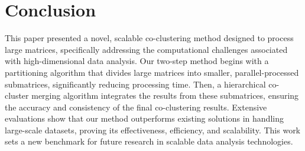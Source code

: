 \documentclass[journal]{IEEEtran}
\begin{document}
\section{Conclusion}
\label{sec:conclusion}
This paper presented a novel, scalable co-clustering method designed to process large matrices, specifically addressing the computational challenges associated with high-dimensional data analysis. Our two-step method begins with a partitioning algorithm that divides large matrices into smaller, parallel-processed submatrices, significantly reducing processing time. Then, a hierarchical co-cluster merging algorithm integrates the results from these submatrices, ensuring the accuracy and consistency of the final co-clustering results. Extensive evaluations show that our method outperforms existing solutions in handling large-scale datasets, proving its effectiveness, efficiency, and scalability. This work sets a new benchmark for future research in scalable data analysis technologies.



\printbibliography
\end{document}
